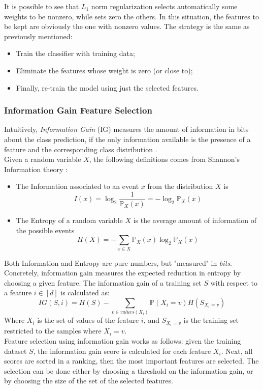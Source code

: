 It is possible to see that $L_1$ norm regularization selects automatically some weights to be nonzero, while sets zero the others. In this situation, the features to be kept are obviously the one with nonzero values. The strategy is the same as previously mentioned:

\begin{itemize}
	\item Train the classifier with training data;
	\item Eliminate the features whose weight is zero (or close to);
	\item Finally, re-train the model using just the selected features.
\end{itemize}



\subsubsection{Information Gain Feature Selection}

Intuitively, \textit{Information Gain} (IG) measures the amount of information in bits about the class prediction, if the only information available is the presence of a feature and the corresponding class distribution \cite{Roobaert_chapter22}.\\
Given a random variable $X$, the following definitions comes from Shannon's Information theory \cite{Shannon1948}:
\begin{itemize}
	\item The Information associated to an event $x$ from the distribution $X$ is
	\[ I(x) = \log_2 \frac{1}{\mathbb{P}_X(x)} = - \log_2 \mathbb{P}_X(x) \]
	\item The Entropy of a random variable $X$ is the average amount of information of the possible events
	\[ H(X) = - \sum_{x \in X} \mathbb{P}_X(x) \log_2 \mathbb{P}_X(x) \]
\end{itemize}

Both Information and Entropy are pure numbers, but "measured" in \textit{bits}.\\
Concretely, information gain measures the expected reduction in entropy by choosing a given feature. The information gain of a training set $S$ with respect to a feature $i \in [d]$ is calculated as:
\[ IG(S, i) = H(S) - \sum_{v \in values(X_i)} \mathbb{P}(X_i = v) H(S_{X_i=v}) \]
Where $X_i$ is the set of values of the feature $i$, and $S_{X_i=v}$ is the training set restricted to the samples where $X_i=v$.\\
Feature selection using information gain works as follows: given the training dataset $S$, the information gain score is calculated for each feature $X_i$. Next, all scores are sorted in a ranking, then the most important features are selected. The selection can be done either by choosing a threshold on the information gain, or by choosing the size of the set of the selected features.\\




